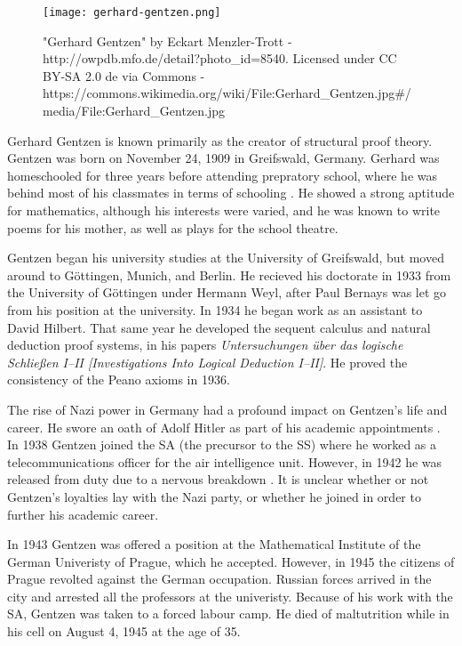 \documentclass[../../../include/open-logic-section]{subfiles}
\begin{document}

\begin{figure}[h!] 
\centering
\texttt{[image: gerhard-gentzen.png]} 
\caption{"Gerhard Gentzen"
by Eckart Menzler-Trott - http://owpdb.mfo.de/detail?photo_id=8540.
Licensed under CC BY-SA 2.0 de via Commons -
https://commons.wikimedia.org/wiki/File:Gerhard_Gentzen.jpg#/media/File:Gerhard_Gentzen.jpg}
\end{figure}

Gerhard Gentzen is known primarily as the creator of structural proof
theory. Gentzen was born on November 24, 1909 in Greifswald, Germany.
Gerhard was homeschooled for three years before attending prepratory
school, where he was behind most of his classmates in terms of schooling
\citep[12]{Menzler-Trott2007}. He showed a strong aptitude for mathematics,
although his interests were varied, and he was known to write poems for his 
mother, as well as plays for the school theatre.

Gentzen began his university studies at the University of Greifswald, but
moved around to G\"{o}ttingen, Munich, and Berlin. He recieved his
doctorate in 1933 from the University of G\"{o}ttingen under Hermann Weyl,
after Paul Bernays was let go from his position at the university.
In 1934 he began work as an assistant to David Hilbert. That same year he
developed the sequent calculus and natural deduction proof systems, in his
papers \emph{Untersuchungen \"{u}ber das logische Schlie\ss en
I--II [Investigations Into Logical Deduction I--II]}. He proved the consistency
 of the Peano axioms in 1936.

The rise of Nazi power in Germany had a profound impact on Gentzen's life
and career. He swore an oath of Adolf Hitler as part
of his academic appointments \citep[119]{Menzler-Trott2007}.
In 1938 Gentzen joined the SA (the precursor to the SS) where he
worked as a telecommunications officer for the air intelligence
unit\citep[469]{Segal2014}. However, in 1942 he was released from duty due
to a nervous breakdown \citep[469]{Segal2014}. It is unclear whether or not
Gentzen's loyalties lay with the Nazi party, or whether he joined in order
to further his academic career.

In 1943 Gentzen was offered a position at the Mathematical Institute of the
German Univeristy of Prague, which he accepted. However, in 1945 the
citizens of Prague revolted against the German occupation. Russian forces
arrived in the city and arrested all the professors at the univeristy.
Because of his work with the SA, Gentzen was taken to a forced labour camp. He
died of maltutrition while in his cell on August 4, 1945 at the age of 35.
\end{document}
